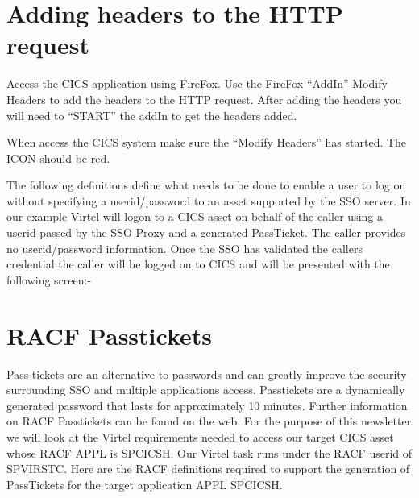 \documentclass[letterpaper,10pt,english]{sphinxmanual}
\begin{document}
\section{Adding headers to the HTTP request}
\label{\detokenize{connectivity_guide:adding-headers-to-the-http-request}}\label{\detokenize{connectivity_guide:index-164}}
Access the CICS application using FireFox. Use the FireFox “AddIn” Modify Headers to add the headers to the HTTP request. After adding the headers you will need to “START” the addIn to get the headers added.

 

When access the CICS system make sure the “Modify Headers” has started. The ICON should be red.



The following definitions define what needs to be done to enable a user to log on without specifying a userid/password to an asset supported by the SSO server. In our example Virtel will logon to a CICS asset on behalf of the caller using a userid passed by the SSO Proxy and a generated PassTicket. The caller provides no userid/password information. Once the SSO has validated the callers credential the caller will be logged on to CICS and will be presented with the following screen:-

 

\newpage

\ignorespaces 

\section{RACF Passtickets}
\label{\detokenize{connectivity_guide:racf-passtickets}}\label{\detokenize{connectivity_guide:index-165}}
Pass tickets are an alternative to passwords and can greatly improve the security surrounding SSO and multiple applications access. Passtickets are a dynamically generated password that lasts for approximately 10 minutes. Further information on RACF Passtickets can be found on the web. For the purpose of this newsletter we will look at the Virtel requirements needed to access our target CICS asset whose RACF APPL is SPCICSH. Our Virtel task runs under the RACF userid of SPVIRSTC. Here are the RACF definitions required to support the generation of PassTickets for the target application APPL SPCICSH.
\end{document}
